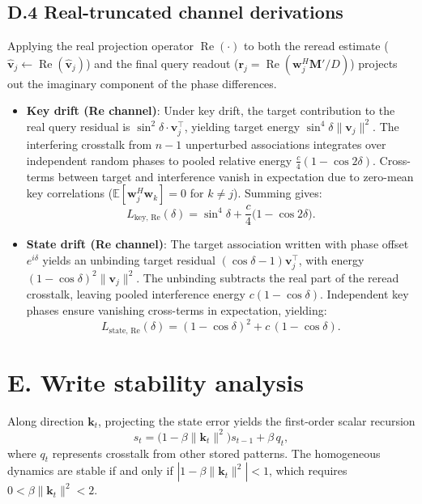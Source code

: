 \documentclass[11pt,a4paper]{article}
\newcommand{\M}{\mathbf{M}}
\begin{document}
\subsection{D.4 Real-truncated channel derivations}
Applying the real projection operator $\operatorname{Re}(\cdot)$ to both the reread estimate ($\hat{\mathbf{v}}_j \leftarrow \operatorname{Re}(\hat{\mathbf{v}}_j)$) and the final query readout ($\mathbf{r}_j = \operatorname{Re}(\mathbf{w}_j^H \M' / D)$) projects out the imaginary component of the phase differences.
\begin{itemize}
  \item \textbf{Key drift (Re channel)}: Under key drift, the target contribution to the real query residual is $\sin^2\delta \cdot \mathbf{v}_j^\top$, yielding target energy $\sin^4\delta \|\mathbf{v}_j\|^2$. The interfering crosstalk from $n-1$ unperturbed associations integrates over independent random phases to pooled relative energy $\frac{c}{4}(1-\cos 2\delta)$. Cross-terms between target and interference vanish in expectation due to zero-mean key correlations ($\mathbb{E}[\mathbf{w}_j^H \mathbf{w}_k]=0$ for $k \ne j$). Summing gives:
  \begin{equation}
  L_{\text{key, Re}}(\delta) = \sin^4\delta + \frac{c}{4}\bigl(1-\cos 2\delta\bigr).
  \end{equation}
  \item \textbf{State drift (Re channel)}: The target association written with phase offset $e^{i\delta}$ yields an unbinding target residual $(\cos\delta-1)\mathbf{v}_j^\top$, with energy $(1-\cos\delta)^2 \|\mathbf{v}_j\|^2$. The unbinding subtracts the real part of the reread crosstalk, leaving pooled interference energy $c(1-\cos\delta)$. Independent key phases ensure vanishing cross-terms in expectation, yielding:
  \begin{equation}
  L_{\text{state, Re}}(\delta) = (1-\cos\delta)^2 + c\,(1-\cos\delta).
  \end{equation}
\end{itemize}

\section{E. Write stability analysis}\label{sec:E}

Along direction $\mathbf{k}_t$, projecting the state error yields the first-order scalar recursion
\begin{equation}
s_t = \bigl(1 - \beta\|\mathbf{k}_t\|^2\bigr) s_{t-1} + \beta\, q_t,
\end{equation}
where $q_t$ represents crosstalk from other stored patterns. The homogeneous dynamics are stable if and only if $|1-\beta\|\mathbf{k}_t\|^2| < 1$, which requires $0 < \beta\|\mathbf{k}_t\|^2 < 2$.
\end{document}
